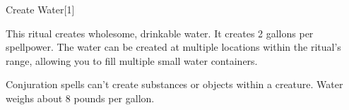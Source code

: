 \begin{spellsection}{Create Water}[1]
    \begin{spellheader}
    \end{spellheader}
    \begin{spellcontent}
        \begin{spelltargetinginfo}
            \spellrng{\rngclose}
        \end{spelltargetinginfo}
        \begin{spelleffects}

            \spelleffect This ritual creates wholesome, drinkable water. It creates 2 gallons per spellpower. The water can be created at multiple locations within the ritual's range, allowing you to fill multiple small water containers.
        \end{spelleffects}
    \end{spellcontent}
    \begin{spellfooter}
        \spellnotes Conjuration spells can't create substances or objects within a creature. Water weighs about 8 pounds per gallon.
    \end{spellfooter}
\end{spellsection}

